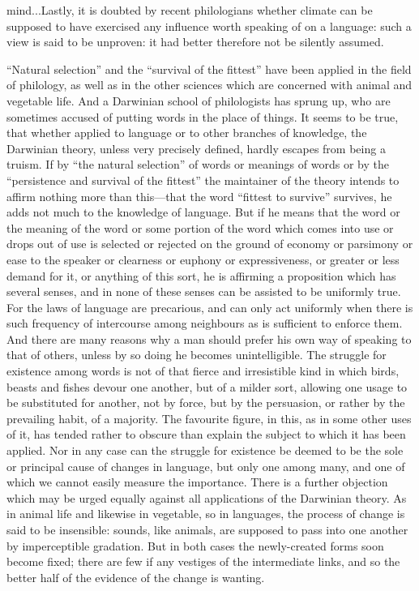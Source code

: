 \documentclass[11pt,letter]{article}
\begin{document}
mind...Lastly, it is doubted by recent philologians whether climate can be supposed to have exercised any influence worth speaking of on a language: such a view is said to be unproven: it had better therefore not be silently assumed.

\par  “Natural selection” and the “survival of the fittest” have been applied in the field of philology, as well as in the other sciences which are concerned with animal and vegetable life. And a Darwinian school of philologists has sprung up, who are sometimes accused of putting words in the place of things. It seems to be true, that whether applied to language or to other branches of knowledge, the Darwinian theory, unless very precisely defined, hardly escapes from being a truism. If by “the natural selection” of words or meanings of words or by the “persistence and survival of the fittest” the maintainer of the theory intends to affirm nothing more than this—that the word “fittest to survive” survives, he adds not much to the knowledge of language. But if he means that the word or the meaning of the word or some portion of the word which comes into use or drops out of use is selected or rejected on the ground of economy or parsimony or ease to the speaker or clearness or euphony or expressiveness, or greater or less demand for it, or anything of this sort, he is affirming a proposition which has several senses, and in none of these senses can be assisted to be uniformly true. For the laws of language are precarious, and can only act uniformly when there is such frequency of intercourse among neighbours as is sufficient to enforce them. And there are many reasons why a man should prefer his own way of speaking to that of others, unless by so doing he becomes unintelligible. The struggle for existence among words is not of that fierce and irresistible kind in which birds, beasts and fishes devour one another, but of a milder sort, allowing one usage to be substituted for another, not by force, but by the persuasion, or rather by the prevailing habit, of a majority. The favourite figure, in this, as in some other uses of it, has tended rather to obscure than explain the subject to which it has been applied. Nor in any case can the struggle for existence be deemed to be the sole or principal cause of changes in language, but only one among many, and one of which we cannot easily measure the importance. There is a further objection which may be urged equally against all applications of the Darwinian theory. As in animal life and likewise in vegetable, so in languages, the process of change is said to be insensible: sounds, like animals, are supposed to pass into one another by imperceptible gradation. But in both cases the newly-created forms soon become fixed; there are few if any vestiges of the intermediate links, and so the better half of the evidence of the change is wanting.
\end{document}
